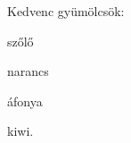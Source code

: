 \documentclass{article}
\begin{document}
Kedvenc gyümölcsök:
\begin{itemize*}[label=\checkmark,itemjoin*={,\spaceés\space}]
\item szőlő
\item narancs
\item áfonya
\item kiwi.
\end{itemize*}
\end{document}

